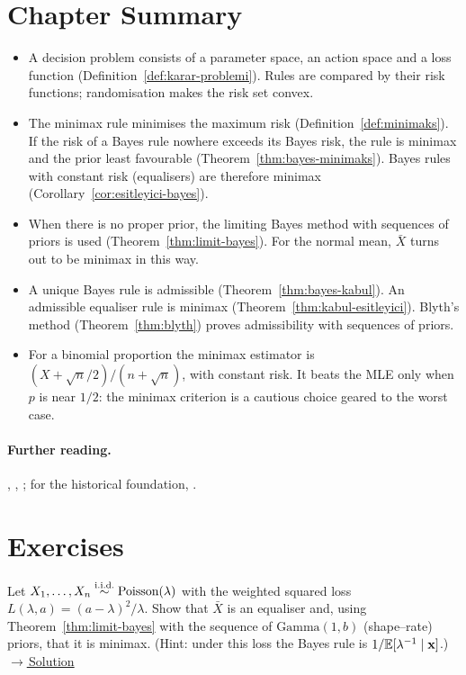 \documentclass[main.tex]{subfiles}
\begin{document}
\section{Chapter Summary}
\begin{summary}
\begin{itemize}
  \item A decision problem consists of a parameter space, an action space and a loss function (Definition~\ref{def:karar-problemi}). Rules are compared by their risk functions; randomisation makes the risk set convex.
  \item The minimax rule minimises the maximum risk (Definition~\ref{def:minimaks}). If the risk of a Bayes rule nowhere exceeds its Bayes risk, the rule is minimax and the prior least favourable (Theorem~\ref{thm:bayes-minimaks}). Bayes rules with constant risk (equalisers) are therefore minimax (Corollary~\ref{cor:esitleyici-bayes}).
  \item When there is no proper prior, the limiting Bayes method with sequences of priors is used (Theorem~\ref{thm:limit-bayes}). For the normal mean, $\bar X$ turns out to be minimax in this way.
  \item A unique Bayes rule is admissible (Theorem~\ref{thm:bayes-kabul}). An admissible equaliser rule is minimax (Theorem~\ref{thm:kabul-esitleyici}). Blyth's method (Theorem~\ref{thm:blyth}) proves admissibility with sequences of priors.
  \item For a binomial proportion the minimax estimator is $(X+\sqrt n/2)/(n+\sqrt n)$, with constant risk. It beats the MLE only when $p$ is near $1/2$: the minimax criterion is a cautious choice geared to the worst case.
\end{itemize}
\end{summary}

\paragraph{Further reading.} \cite{berger85}, \cite[Chapters~4--5]{lehmann-casella}, \cite[Section~7.3.4]{casella}; for the historical foundation, \cite{wald50}.

\section{Exercises}

\begin{exercise}\label{exr:20-1}
Let $X_1,\dots,X_n\overset{\text{i.i.d.}}{\sim}\text{Poisson}(\lambda)$ with the weighted squared loss $L(\lambda,a)=(a-\lambda)^2/\lambda$. Show that $\bar X$ is an equaliser and, using Theorem~\ref{thm:limit-bayes} with the sequence of $\text{Gamma}(1,b)$ (shape--rate) priors, that it is minimax. (Hint: under this loss the Bayes rule is $1/\mathbb{E}[\lambda^{-1}\mid\mathbf{x}]$.)
\hfill\hyperref[coz:20-1]{\footnotesize$\rightarrow$\,Solution}
\end{exercise}
\end{document}
